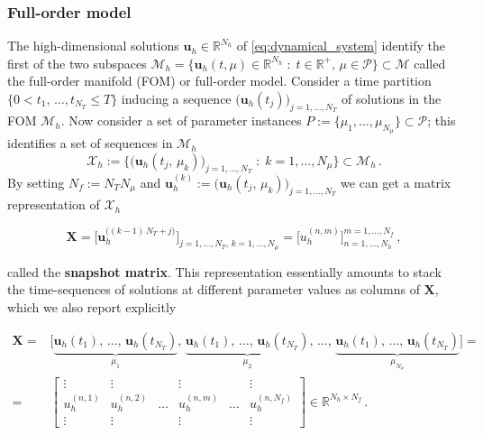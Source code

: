 \documentclass[../main.tex]{subfiles}
\begin{document}
\subsubsection{Full-order model}\label{subsubsec:fom}

The high-dimensional solutions $\boldsymbol{u}_{h}\in \mathbb{R}^{N_{h}}$ of \eqref{eq:dynamical_system} identify the first of the two subspaces $\mathcal{M}_{h}=\{\boldsymbol{u}_{h}(t,\mu)\in \mathbb{R}^{N_{h}}\;:\;t\in \mathbb{R}^{+},\,\mu\in \mathcal{P}\}\subset \mathcal{M}$ called the full-order manifold (FOM) or full-order model.
Consider a time partition $\{0<t_{1},\,\dots,t_{N_{T}}\leq T\}$ inducing a sequence $\Big(\boldsymbol{u}_{h}(t_{j})\Big)_{j=1,\dots,N_{T}}$ of solutions in the FOM $\mathcal{M}_{h}$.
Now consider a set of parameter instances $P:=\{\mu_{1},\dots,\mu_{N_{\mu}}\}\subset \mathcal{P}$; this identifies a set of sequences in $\mathcal{M}_{h}$
\begin{equation*}
        \mathcal{X}_{h}:=\bigg\{\Big(\boldsymbol{u}_{h}(t_{j},\,\mu_{k})\Big)_{j=1,\dots,N_{T}}\;:\;k=1,\dots,N_{\mu}\bigg\}\subset \mathcal{M}_{h}\,.
\end{equation*}
By setting $N_{f}:=N_{T}N_{\mu}$ and $\boldsymbol{u}_{h}^{(k)}:=\Big(\boldsymbol{u}_{h}(t_{j},\,\mu_{k})\Big)_{j=1,\dots,N_{T}}$ we can get a matrix representation of $\mathcal{X}_{h}$

\begin{equation}\label{eq:snapshot_mat}
        \boldsymbol{X} = \bigg[\boldsymbol{u}_{h}^{\big((k-1)\,N_{T} + j\big)}\bigg]_{j=1,\dots,N_{T},\,k=1,\dots,N_{\mu}} = \bigg[u_{h}^{(n,m)}\bigg]_{n=1,\dots,N_{h}}^{m=1,\dots,N_{f}}\,,  
\end{equation}

called the \textbf{snapshot matrix}.
This representation essentially amounts to stack the time-sequences of solutions at different parameter values as columns of $\boldsymbol{X}$, which we also report explicitly

\begin{align*}
        \boldsymbol{X} =& \bigg[\underbrace{\boldsymbol{u}_{h}(t_{1}),\,\dots,\,\boldsymbol{u}_{h}(t_{N_{T}})}_{\mu_{1}},\,\underbrace{\boldsymbol{u}_{h}(t_{1}),\,\dots,\,\boldsymbol{u}_{h}(t_{N_{T}})}_{\mu_{2}},\,\dots,\,\underbrace{\boldsymbol{u}_{h}(t_{1}),\,\dots,\,\boldsymbol{u}_{h}(t_{N_{T}})}_{\mu_{N_{\mu}}}\bigg] = \\
        =& \begin{bmatrix}
                \vdots & \vdots & & \vdots & & \vdots\\
                u_{h}^{(n,1)} & u_{h}^{(n,2)} & \dots & u_{h}^{(n,m)} & \dots & u_{h}^{(n,N_{f})} \\
                \vdots & \vdots & & \vdots & & \vdots 
        \end{bmatrix}\in \mathbb{R}^{N_{h}\times N_{f}}\,.
\end{align*}
\end{document}
